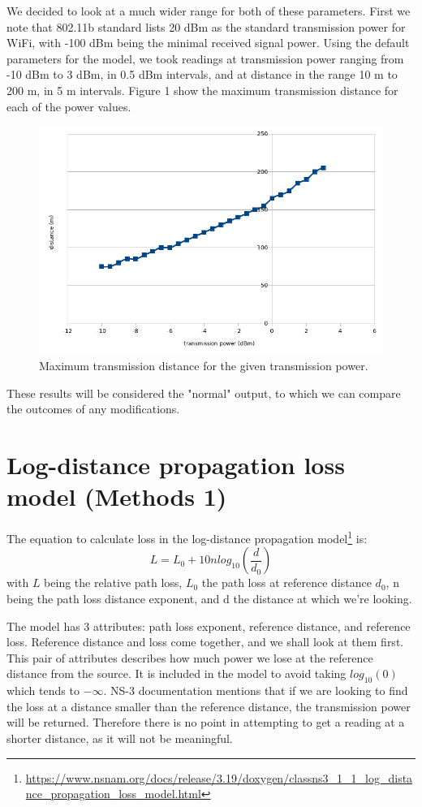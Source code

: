 \documentclass[11pt,journal]{article}
\begin{document}
	We decided to look at a much wider range for both of these parameters. First we note that 802.11b standard lists 20 dBm as the standard transmission power for WiFi, with -100 dBm being the minimal received signal power. Using the default parameters for the model, we took readings at transmission power ranging from -10 dBm to 3 dBm, in 0.5 dBm intervals, and at distance in the range 10 m to 200 m, in 5 m intervals. Figure 1 show the maximum transmission distance for each of the power values.
	
	\begin{figure}[h]
		\centering
		\includegraphics[scale=0.8]{graph_initial.png}
		\caption{Maximum transmission distance for the given transmission power.}
	\end{figure}

	These results will be considered the "normal" output, to which we can compare the outcomes of any modifications.
	
	
	
	\section{Log-distance propagation loss model (Methods 1)}
	The equation to calculate loss in the log-distance propagation model\footnote{\url{https://www.nsnam.org/docs/release/3.19/doxygen/classns3_1_1_log_distance_propagation_loss_model.html}} is:
	\[L = L_0 + 10nlog_{10}(\dfrac{d}{d_0})\] 
	with $L$ being the relative path loss, $L_0$ the path loss at reference distance $d_0$, n being the path loss distance exponent, and d the distance at which we're looking.
	
	The model has 3 attributes: path loss exponent, reference distance, and reference loss. Reference distance and loss come together, and we shall look at them first. This pair of attributes describes how much power we lose at the reference distance from the source. It is included in the model to avoid taking $log_{10}(0)$ which tends to $-\infty$. NS-3 documentation mentions that if we are looking to find the loss at a distance smaller than the reference distance, the transmission power will be returned. Therefore there is no point in attempting to get a reading at a shorter distance, as it will not be meaningful. 
	
\end{document}
